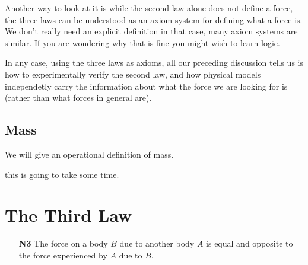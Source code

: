 Another way to look at it is while the second law alone does not define a force, the three laws 
can be understood as an axiom system for defining what a force is. We don't really need an explicit definition in 
that case, many axiom systems are similar. If you are wondering why that is fine you might wish to learn logic. 


In any case, using the three laws as axioms, all our preceding discussion tells us is how to experimentally verify
the second law, and how physical models independetly carry the information about what the force we are looking for is 
(rather than what forces in general are).

\subsection{Mass}

We will give an operational definition of mass.

this is going to take some time.


\section{The Third Law}

\begin{enumerate}
    \item[\textbf{N3}] The force on a body \(B\) due to another body \(A\) is equal and opposite to the force experienced
    by \(A\) due to \(B\). 
\end{enumerate}